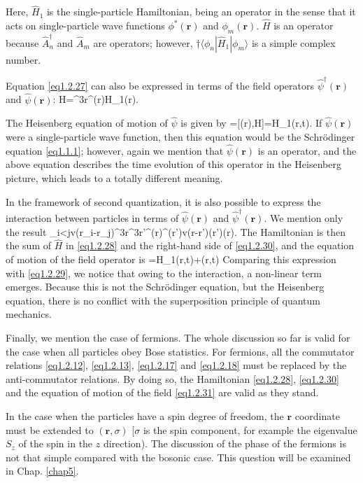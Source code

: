Here, $\hat H_1$ is the single-particle Hamiltonian, being an operator in the sense that it acts on single-particle wave functions $\phi^*(\bm r)$ and $\phi_m(\bm r)$. $\hat H$ is an operator because $\hat A_n^\dagger$ and $\hat A_m$ are operators; however, $\dagger\langle\phi_n|\hat H_1|\phi_m\rangle$ is a simple complex number.

Equation \eqref{eq1.2.27} can also be expressed in terms of the field operators $\hat\psi^\dagger(\bm r)$ and $\hat\psi(\bm r)$:
\be\label{eq1.2.28}
\hat H=\int^3\dd\bm r\hat\psi^\dagger(\bm r)\hat H_1\hat\psi(\bm r). 
\ee

The Heisenberg equation of motion of $\hat\psi$ is given by
\be\label{eq1.2.29}
\ii\hbar{}=[\hat\psi(\bm r),\hat H]=\hat H_1\hat\psi(\bm r,t). 
\ee
If $\hat\psi(\bm r)$ were a single-particle wave function, then this equation would be the Schrödinger equation \eqref{eq1.1.1}; however, again we mention that $\hat\psi(\bm r)$ is an operator, and the above equation describes the time evolution of this operator in the Heisenberg picture, which leads to a totally different meaning.

In the framework of second quantization, it is also possible to express the interaction between particles in terms of $\hat\psi(\bm r)$ and $\hat\psi^\dagger(\bm r)$. We mention only the result
\be\label{eq1.2.30}
\sum_{i<j}v(\bm r_i-\bm r_j)\to{}\int\dd^3\bm r\dd^3\bm r'\hat\psi^\dagger(\bm r)\hat\psi^\dagger(\bm r')v(\bm r-\bm r')\hat\psi(\bm r')\hat\psi(\bm r). 
\ee
The Hamiltonian is then the sum of $\hat H$ in \eqref{eq1.2.28} and the right-hand side of \eqref{eq1.2.30}, and the equation of motion of the field operator is
\be\label{eq1.2.31}
\ii\hbar{}=\hat H_1\hat\psi(\bm r,t)+\hat\psi(\bm r,t)
\ee
Comparing this expression with \eqref{eq1.2.29}, we notice that owing to the interaction, a non-linear term emerges. Because this is not the Schrödinger equation, but the Heisenberg equation, there is no conflict with the superposition principle of quantum mechanics.

Finally, we mention the case of fermions. The whole discussion so far is valid for the case when all particles obey Bose statistics. For fermions, all the commutator relations \eqref{eq1.2.12}, \eqref{eq1.2.13}, \eqref{eq1.2.17} and \eqref{eq1.2.18} must be replaced by the anti-commutator relations. By doing so, the Hamiltonian \eqref{eq1.2.28}, \eqref{eq1.2.30} and the equation of motion of the field \eqref{eq1.2.31} are valid as they stand.

In the case when the particles have a spin degree of freedom, the $\bm r$ coordinate must be extended to $(\bm r, \sigma)$ [$\sigma$ is the spin component, for example the eigenvalue $S_z$ of the spin in the $z$ direction). The discussion of the phase of the fermions is not that simple compared with the bosonic case. This question will be examined in Chap. \ref{chap5}.
